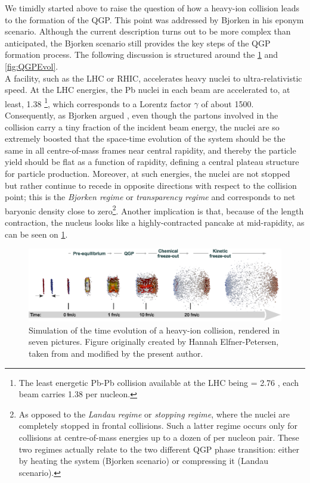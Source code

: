 We timidly started above to raise the question of how a heavy-ion collision leads to the formation of the QGP. This point was addressed by Bjorken in his eponym scenario. Although the current description turns out to be more complex than anticipated, the Bjorken scenario still provides the key steps of the QGP formation process. The following discussion is structured around the \figs\ref{fig:PbPbSimu} and \ref{fig:QGPEvol}.\\

A facility, such as the LHC or RHIC, accelerates heavy nuclei to ultra-relativistic speed. At the LHC energies, the Pb nuclei in each beam are accelerated to, at least, 1.38 \tev\footnote{The least energetic Pb-Pb collision available at the LHC being \sqrtSnn = 2.76 \tev, each beam carries 1.38 \tev per nucleon.}, which corresponds to a Lorentz factor $\gamma$ of about 1500. Consequently, as Bjorken argued \cite{bjorkenHighlyRelativisticNucleusnucleus1983}, even though the partons involved in the collision carry a tiny fraction of the incident beam energy, the nuclei are so extremely boosted that the space-time evolution of the system should be the same in all centre-of-mass frames near central rapidity, and thereby the particle yield should be flat as a function of rapidity, defining a central plateau structure for particle production. Moreover, at such energies, the nuclei are not stopped but rather continue to recede in opposite directions with respect to the collision point; this is the \textit{Bjorken regime} or \textit{transparency regime} and corresponds to net baryonic density close to zero\footnote{As opposed to the \textit{Landau regime} or \textit{stopping regime}, where the nuclei are completely stopped in frontal collisions. Such a latter regime occurs only for collisions at centre-of-mass energies up to a dozen of \gev per nucleon pair. These two regimes actually relate to the two different QGP phase transition: either by heating the system (Bjorken scenario) or compressing it (Landau scenario).}. Another implication is that, because of the length contraction, the nucleus looks like a highly-contracted pancake at mid-rapidity, as can be seen on \fig\ref{fig:PbPbSimu}.\\

\begin{figure}[h]
	\centering
	\hspace*{-2cm}\includegraphics[width=1.35\textwidth]{Figs/Chapter2/PbPbCollision.eps}
	\caption{Simulation of the time evolution of a heavy-ion collision, rendered in seven pictures. Figure originally created by Hannah Elfner-Petersen, taken from \cite{bernhardBayesianParameterEstimation2018} and modified by the present author.}
	\label{fig:PbPbSimu}
\end{figure}

